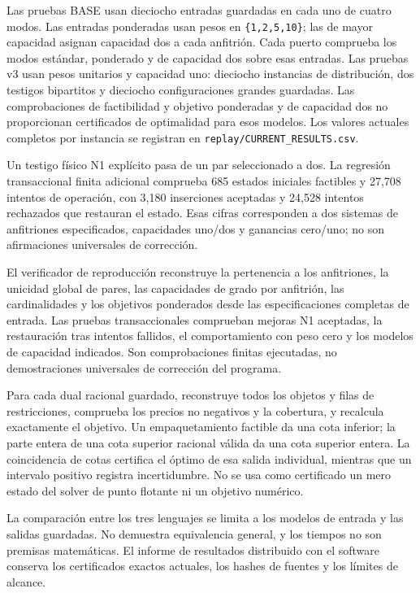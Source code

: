 \documentclass[spanish,11pt,a4paper]{article}
\begin{document}
Las pruebas BASE usan dieciocho entradas guardadas en cada uno de cuatro
modos. Las entradas ponderadas usan pesos en \texttt{\{1,2,5,10\}}; las
de mayor capacidad asignan capacidad dos a cada anfitrión. Cada puerto
comprueba los modos estándar, ponderado y de capacidad dos sobre esas
entradas. Las pruebas v3 usan pesos unitarios y capacidad uno: dieciocho
instancias de distribución, dos testigos bipartitos y dieciocho
configuraciones grandes guardadas. Las comprobaciones de factibilidad y
objetivo ponderadas y de capacidad dos no proporcionan certificados de
optimalidad para esos modelos. Los valores actuales completos por
instancia se registran en \nolinkurl{replay/CURRENT_RESULTS.csv}.

Un testigo físico N1 explícito pasa de un par seleccionado a dos. La
regresión transaccional finita adicional comprueba 685 estados iniciales
factibles y 27,708 intentos de operación, con 3,180 inserciones
aceptadas y 24,528 intentos rechazados que restauran el estado. Esas
cifras corresponden a dos sistemas de anfitriones especificados,
capacidades uno/dos y ganancias cero/uno; no son afirmaciones
universales de corrección.

El verificador de reproducción reconstruye la pertenencia a los
anfitriones, la unicidad global de pares, las capacidades de grado por
anfitrión, las cardinalidades y los objetivos ponderados desde las
especificaciones completas de entrada. Las pruebas transaccionales
comprueban mejoras N1 aceptadas, la restauración tras intentos fallidos,
el comportamiento con peso cero y los modelos de capacidad indicados.
Son comprobaciones finitas ejecutadas, no demostraciones universales de
corrección del programa.

Para cada dual racional guardado, reconstruye todos los objetos y filas
de restricciones, comprueba los precios no negativos y la cobertura, y
recalcula exactamente el objetivo. Un empaquetamiento factible da una
cota inferior; la parte entera de una cota superior racional válida da
una cota superior entera. La coincidencia de cotas certifica el óptimo
de esa salida individual, mientras que un intervalo positivo registra
incertidumbre. No se usa como certificado un mero estado del solver de
punto flotante ni un objetivo numérico.

La comparación entre los tres lenguajes se limita a los modelos de
entrada y las salidas guardadas. No demuestra equivalencia general, y
los tiempos no son premisas matemáticas. El informe de resultados
distribuido con el software conserva los certificados exactos actuales,
los hashes de fuentes y los límites de alcance.
\end{document}
